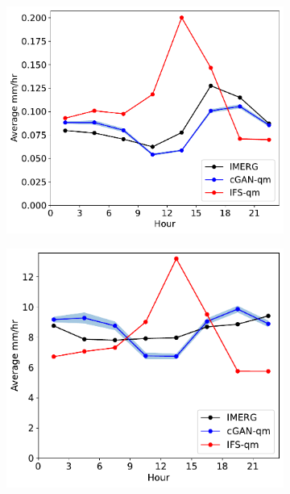 \documentclass{article}
\begin{document}
\begin{figure}[t]
    \centering
     \begin{subfigure}[t]{0.33\textwidth}
 \includegraphics[width=\textwidth]{images/diurnal_cycle_mean_final-nologs_217600.pdf}
     \caption{}
     \end{subfigure}
     \begin{subfigure}[t]{0.32\textwidth}
     \includegraphics[width=\textwidth]{images/diurnal_cycle_quantile_999_final-nologs_217600.pdf}
     \caption{}
     \end{subfigure}

\end{figure}
\end{document}
